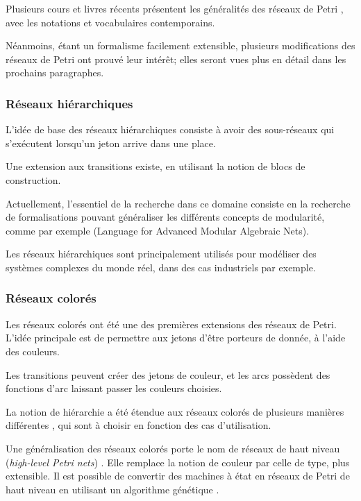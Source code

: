 Plusieurs cours et livres récents présentent les généralités des réseaux de Petri \citep[voir][]{david2010discrete, diaz2013petri}, avec les notations et vocabulaires contemporains.

Néanmoins, étant un formalisme facilement extensible, plusieurs modifications des réseaux de Petri ont prouvé leur intérêt; elles seront vues plus en détail dans les prochains paragraphes.
\subsubsection{Réseaux hiérarchiques}
L'idée de base des réseaux hiérarchiques consiste à avoir des sous-réseaux qui s'exécutent lorsqu'un jeton arrive dans une place.

Une extension aux transitions existe, en utilisant la notion de blocs de construction\cite{fehling1993concept}.

Actuellement, l'essentiel de la recherche dans ce domaine consiste en la recherche de formalisations pouvant généraliser les différents concepts de modularité, comme par exemple  (Language for Advanced Modular Algebraic Nets)\cite{colom2013application}.

Les réseaux hiérarchiques sont principalement utilisés pour modéliser des systèmes complexes du monde réel, dans des cas industriels par exemple.

\subsubsection{Réseaux colorés}
Les réseaux colorés\cite{zervos1977colored,jensen1987coloured} ont été une des premières extensions des réseaux de Petri. L'idée principale est de permettre aux jetons d'être porteurs de donnée, à l'aide des couleurs. 

Les transitions peuvent créer des jetons de couleur, et les arcs possèdent des fonctions d'arc laissant passer les couleurs choisies.

La notion de hiérarchie a été étendue aux réseaux colorés de plusieurs manières différentes \cite{rozenberg1991advances}, qui sont à choisir en fonction des cas d'utilisation.

Une généralisation des réseaux colorés porte le nom de réseaux de haut niveau (\textit{high-level Petri nets}) \cite{jensen1983high}. Elle remplace la notion de couleur par celle de type, plus extensible.
Il est possible de convertir des machines à état  en réseaux de Petri de haut niveau en utilisant un algorithme génétique \cite{alhroob2014transforming}.

